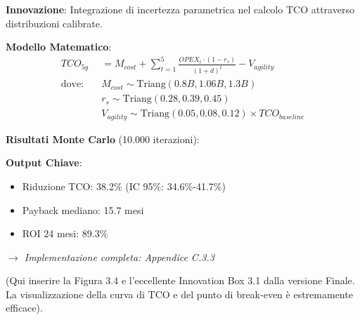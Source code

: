 \begin{tcolorbox}[
    colback=orange!5!white,
    colframe=orange!65!black,
    title={\textbf{Innovation Box 3.1:} Modello TCO Stocastico per Cloud Migration},
    fonttitle=\bfseries,
    boxrule=1.5pt,
    arc=2mm,
    breakable
]
\textbf{Innovazione}: Integrazione di incertezza parametrica nel calcolo TCO attraverso distribuzioni calibrate.

\vspace{0.3cm}
\textbf{Modello Matematico}:
\begin{align*}
TCO_{5y} &= M_{cost} + \sum_{t=1}^{5} \frac{OPEX_t \cdot (1-r_s)}{(1+d)^t} - V_{agility} \\
\text{dove:} \quad & M_{cost} \sim \text{Triang}(0.8B, 1.06B, 1.3B) \\
& r_s \sim \text{Triang}(0.28, 0.39, 0.45) \\
& V_{agility} \sim \text{Triang}(0.05, 0.08, 0.12) \times TCO_{baseline}
\end{align*}

\vspace{0.3cm}
\textbf{Risultati Monte Carlo} (10.000 iterazioni):
\begin{center}
\end{center}

\textbf{Output Chiave}:
\begin{itemize}%
    \item Riduzione TCO: 38.2\% (IC 95\%: 34.6\%-41.7\%)
    \item Payback mediano: 15.7 mesi
    \item ROI 24 mesi: 89.3\%
\end{itemize}

\textit{$\rightarrow$ Implementazione completa: Appendice C.3.3}
\end{tcolorbox}

(Qui inserire la Figura 3.4 e l'eccellente Innovation Box 3.1 dalla versione Finale. La visualizzazione della curva di TCO e del punto di break-even è estremamente efficace).

